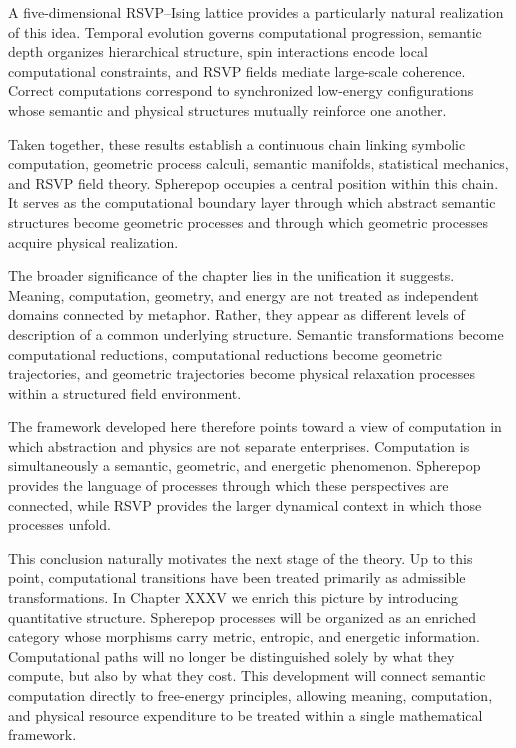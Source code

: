 \documentclass[12pt,letterpaper]{article}
\theoremstyle{remark}
\begin{document}
A five-dimensional RSVP--Ising lattice provides a particularly natural realization of this idea. Temporal evolution governs computational progression, semantic depth organizes hierarchical structure, spin interactions encode local computational constraints, and RSVP fields mediate large-scale coherence. Correct computations correspond to synchronized low-energy configurations whose semantic and physical structures mutually reinforce one another.

Taken together, these results establish a continuous chain linking symbolic computation, geometric process calculi, semantic manifolds, statistical mechanics, and RSVP field theory. Spherepop occupies a central position within this chain. It serves as the computational boundary layer through which abstract semantic structures become geometric processes and through which geometric processes acquire physical realization.

The broader significance of the chapter lies in the unification it suggests. Meaning, computation, geometry, and energy are not treated as independent domains connected by metaphor. Rather, they appear as different levels of description of a common underlying structure. Semantic transformations become computational reductions, computational reductions become geometric trajectories, and geometric trajectories become physical relaxation processes within a structured field environment.

The framework developed here therefore points toward a view of computation in which abstraction and physics are not separate enterprises. Computation is simultaneously a semantic, geometric, and energetic phenomenon. Spherepop provides the language of processes through which these perspectives are connected, while RSVP provides the larger dynamical context in which those processes unfold.

This conclusion naturally motivates the next stage of the theory. Up to this point, computational transitions have been treated primarily as admissible transformations. In Chapter XXXV we enrich this picture by introducing quantitative structure. Spherepop processes will be organized as an enriched category whose morphisms carry metric, entropic, and energetic information. Computational paths will no longer be distinguished solely by what they compute, but also by what they cost. This development will connect semantic computation directly to free-energy principles, allowing meaning, computation, and physical resource expenditure to be treated within a single mathematical framework.
\end{document}
